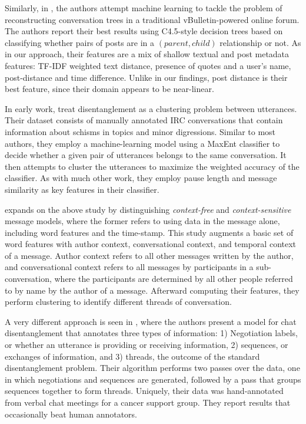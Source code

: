 \documentclass{article}
\begin{document}
Similarly, in , the authors attempt machine learning to
tackle the problem of reconstructing conversation trees in a traditional
vBulletin-powered online forum. The authors report their best results using
C4.5-style decision trees based on classifying whether pairs of posts are in a
$(parent, child)$ relationship or not. As in our approach, their features are
a mix of shallow textual and post metadata features: TF-IDF weighted text
distance, presence of quotes and a user's name, post-distance and time
difference. Unlike in our findings, post distance is their best feature, since
their domain appears to be near-linear.

In early work,  treat disentanglement as a clustering
problem between utterances. Their dataset consists of manually annotated IRC
conversations that contain information about schisms in topics and minor
digressions. Similar to most authors, they employ a machine-learning model
using a MaxEnt classifier to decide whether a given pair of utterances belongs
to the same conversation. It then attempts to cluster the utterances to
maximize the weighted accuracy of the classifier. As with much other work,
they employ pause length and message similarity as key features in their
classifier.

 expands on the above study by distinguishing
\textit{context-free} and \textit{context-sensitive} message models, where the 
former refers to using data in the message alone, including word features and the
time-stamp.  This study augments a basic set of word features with author context, 
conversational context, and temporal context of a message. Author context 
refers to all other messages written by the author, and conversational context 
refers to all messages by participants in a sub-conversation, 
where the participants are determined by all other people referred to by name 
by the author of a message.  Afterward computing their features, they perform
clustering to identify different threads of conversation.

A very different approach is seen in , where the authors present
a model for chat disentanglement that annotates three types of information: 1) 
Negotiation labels, or whether an utterance is providing or receiving 
information, 2) sequences, or exchanges of information, and 3) threads, the 
outcome of the standard disentanglement problem. Their algorithm performs 
two passes over the data,  one in which negotiations and sequences are generated, 
followed by a pass that groups sequences together to form threads. Uniquely,
their data was hand-annotated from verbal chat meetings for a cancer support group.
They report results that occasionally beat human annotators.
\end{document}
